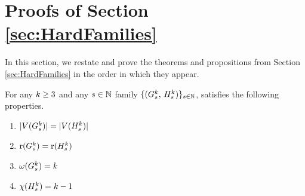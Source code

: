 \section{Proofs of Section \ref{sec:HardFamilies}}\label{app:HardFamilies}

In this section, we restate and prove the theorems and propositions from Section \ref{sec:HardFamilies} in the order in which they appear.

\begin{proposition}\label{app:GraphClassGProps}
    For any  $k \geq 3$ and any $s \in \mathbb{N}$ family $\{(G_s^k,\, H_s^k)\}_{s \in \mathbb{N}}$, satisfies the following properties.
    \begin{enumerate}
        \item $|V(G_s^k)|= |V(H_s^k)|$ \label{GraphClassGPropsVertexNum}
        \item $\mathrm{r}(G_s^k)=\mathrm{r}(H_s^k)$\label{GraphClassGPropsRegularity}
        \item $\omega(G_s^k) = k$ \label{GraphClassGPropsCliqueNum}
        \item $\chi(H_s^k) = k-1$ \label{GraphClassGPropsChromaticNum}
    \end{enumerate}
\end{proposition}
